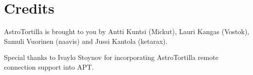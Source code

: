 \documentclass[english]{article}
\begin{document}
\section{Credits}

AstroTortilla is brought to you by Antti Kuntsi (Mickut), Lauri Kangas (Vostok), Samuli Vuorinen (naavis) and Jussi Kantola (ketarax). 

Special thanks to Ivaylo Stoynov for incorporating AstroTortilla remote connection support into APT.

\end{document}
